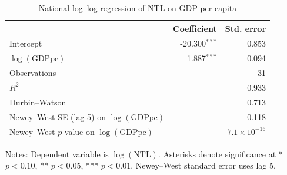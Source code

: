 \begin{table}[ht]
\centering
\caption{National log--log regression of NTL on GDP per capita}
\begin{tabular}{lrr}
\toprule
 & Coefficient & Std. error \\
\midrule
Intercept & -20.300$^{***}$ & 0.853 \\
$\log(\mathrm{GDPpc})$ & 1.887$^{***}$ & 0.094 \\
\midrule
Observations & \multicolumn{2}{r}{31} \\
$R^2$ & \multicolumn{2}{r}{0.933} \\
Durbin--Watson & \multicolumn{2}{r}{0.713} \\
Newey--West SE (lag 5) on $\log(\mathrm{GDPpc})$ & \multicolumn{2}{r}{0.118} \\
Newey--West $p$-value on $\log(\mathrm{GDPpc})$ & \multicolumn{2}{r}{$7.1\times 10^{-16}$} \\
\bottomrule
\end{tabular}
\vspace{4pt}
{\footnotesize Notes: Dependent variable is $\log(\mathrm{NTL})$. Asterisks denote significance at * $p<0.10$, ** $p<0.05$, *** $p<0.01$. Newey--West standard error uses lag 5.}
\label{tab:national_reg}
\end{table}
